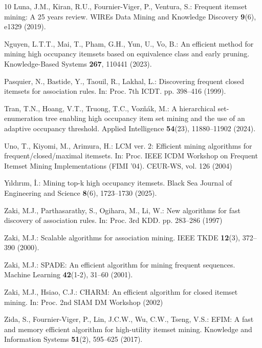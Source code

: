 \documentclass[runningheads,orivec]{llncs}
\begin{document}
\begin{thebibliography}{10}
Luna, J.M., Kiran, R.U., Fournier-Viger, P., Ventura, S.: Frequent itemset mining: A 25 years review. WIREs Data Mining and Knowledge Discovery \textbf{9}(6), e1329 (2019). 

Nguyen, L.T.T., Mai, T., Pham, G.H., Yun, U., Vo, B.: An efficient method for mining high occupancy itemsets based on equivalence class and early pruning. Knowledge-Based Systems \textbf{267}, 110441 (2023). 

Pasquier, N., Bastide, Y., Taouil, R., Lakhal, L.: Discovering frequent closed itemsets for association rules. In: Proc. 7th ICDT. pp. 398--416 (1999). 

Tran, T.N., Hoang, V.T., Truong, T.C., Voz{\v{n}}{\'a}k, M.: A hierarchical set-enumeration tree enabling high occupancy item set mining and the use of an adaptive occupancy threshold. Applied Intelligence \textbf{54}(23), 11880--11902 (2024). 

Uno, T., Kiyomi, M., Arimura, H.: LCM ver. 2: Efficient mining algorithms for frequent/closed/maximal itemsets. In: Proc. IEEE ICDM Workshop on Frequent Itemset Mining Implementations (FIMI '04). CEUR-WS, vol. 126 (2004)

Y{\i}ld{\i}r{\i}m, {\.I}.: Mining top-k high occupancy itemsets. Black Sea Journal of Engineering and Science \textbf{8}(6), 1723--1730 (2025). 

Zaki, M.J., Parthasarathy, S., Ogihara, M., Li, W.: New algorithms for fast discovery of association rules. In: Proc. 3rd KDD. pp. 283--286 (1997)

Zaki, M.J.: Scalable algorithms for association mining. IEEE TKDE \textbf{12}(3), 372--390 (2000). 

Zaki, M.J.: SPADE: An efficient algorithm for mining frequent sequences. Machine Learning \textbf{42}(1-2), 31--60 (2001). 

Zaki, M.J., Hsiao, C.J.: CHARM: An efficient algorithm for closed itemset mining. In: Proc. 2nd SIAM DM Workshop (2002)

Zida, S., Fournier-Viger, P., Lin, J.C.W., Wu, C.W., Tseng, V.S.: EFIM: A fast and memory efficient algorithm for high-utility itemset mining. Knowledge and Information Systems \textbf{51}(2), 595--625 (2017). 

\end{thebibliography}
\end{document}

